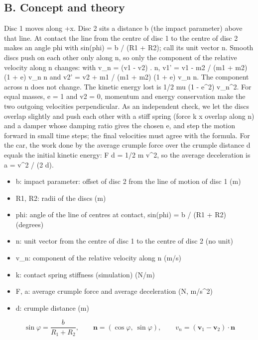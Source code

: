 \documentclass[11pt,a4paper]{article}
\begin{document}
\subsection*{B. Concept and theory}
Disc 1 moves along +x. Disc 2 sits a distance b (the impact parameter) above that line. At contact the line from the centre of disc 1 to the centre of disc 2 makes an angle phi with sin(phi) = b / (R1 + R2); call its unit vector n. Smooth discs push on each other only along n, so only the component of the relative velocity along n changes: with v\_n = (v1 - v2) . n, v1' = v1 - m2 / (m1 + m2) (1 + e) v\_n n and v2' = v2 + m1 / (m1 + m2) (1 + e) v\_n n. The component across n does not change. The kinetic energy lost is 1/2 mu (1 - e\textasciicircum{}2) v\_n\textasciicircum{}2. For equal masses, e = 1 and v2 = 0, momentum and energy conservation make the two outgoing velocities perpendicular. As an independent check, we let the discs overlap slightly and push each other with a stiff spring (force k x overlap along n) and a damper whose damping ratio gives the chosen e, and step the motion forward in small time steps; the final velocities must agree with the formula. For the car, the work done by the average crumple force over the crumple distance d equals the initial kinetic energy: F d = 1/2 m v\textasciicircum{}2, so the average deceleration is a = v\textasciicircum{}2 / (2 d).

\begin{itemize}[nosep]
\item b: impact parameter: offset of disc 2 from the line of motion of disc 1 (m)
\item R1, R2: radii of the discs (m)
\item phi: angle of the line of centres at contact, sin(phi) = b / (R1 + R2) (degrees)
\item n: unit vector from the centre of disc 1 to the centre of disc 2 (no unit)
\item v\_n: component of the relative velocity along n (m/s)
\item k: contact spring stiffness (simulation) (N/m)
\item F, a: average crumple force and average deceleration (N, m/s\textasciicircum{}2)
\item d: crumple distance (m)
\end{itemize}

\[ \sin\varphi = \frac{b}{R_1 + R_2},\qquad \mathbf n = (\cos\varphi,\ \sin\varphi),\qquad v_n = (\mathbf v_1 - \mathbf v_2)\cdot\mathbf n \]
\end{document}
